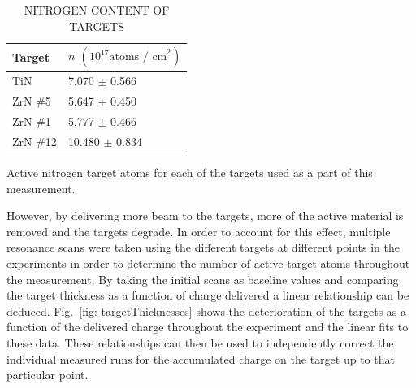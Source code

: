 \begin{table}[]
\caption{NITROGEN CONTENT OF TARGETS}
\centering
\begin{threeparttable}
\begin{tabular}{@{}ll@{}}
\toprule
Target & $n$ $\left(10^{17} \text{atoms / cm}^{2} \right)$ \\ \midrule
TiN    & 7.070 $\pm$ 0.566                        \\
ZrN \#5  & 5.647 $\pm$ 0.450                        \\
ZrN \#1  & 5.777 $\pm$ 0.466                        \\
ZrN \#12 & 10.480 $\pm$ 0.834                       \\ \bottomrule
\end{tabular}
\begin{tablenotes}
\small
\item Active nitrogen target atoms for each of the targets used as a part of this measurement. 
\end{tablenotes}
\end{threeparttable}
\label{tbl: targetAtoms}
\end{table}


However, by delivering more beam to the targets, more of the active material is removed and the targets degrade. In order to account for this effect, multiple resonance scans were taken using the different targets at different points in the experiments in order to determine the number of active target atoms throughout the measurement. By taking the initial scans as baseline values and comparing the target thickness as a function of charge delivered a linear relationship can be deduced. Fig.\ \ref{fig: targetThicknesses} shows the deterioration of the targets as a function of the delivered charge throughout the experiment and the linear fits to these data. These relationships can then be used to independently correct the individual measured runs for the accumulated charge on the target up to that particular point. 

